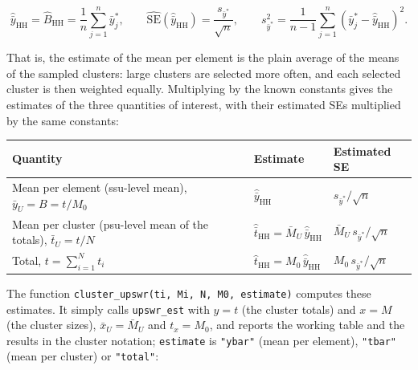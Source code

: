 \documentclass[
  letterpaper,
  DIV=11,
  numbers=noendperiod]{scrreprt}
\newcounter{none} %
\renewcommand{\[}{\begin{equation}}
\renewcommand{\]}{\end{equation}}
\begin{document}
\[
\boxed{\hat{\bar{y}}_{\mathrm{HH}}=\hat{B}_{\mathrm{HH}}=\frac{1}{n}\sum_{j=1}^n \bar{y}_j^*},\qquad
\widehat{\mathrm{SE}}(\hat{\bar{y}}_{\mathrm{HH}})=\frac{s_{\bar{y}^*}}{\sqrt{n}},\qquad
s_{\bar{y}^*}^2=\frac{1}{n-1}\sum_{j=1}^n\left(\bar{y}_j^*-\hat{\bar{y}}_{\mathrm{HH}}\right)^2 .
\]

That is, the estimate of the mean per element is the plain average of
the means of the sampled clusters: large clusters are selected more
often, and each selected cluster is then weighted equally. Multiplying
by the known constants gives the estimates of the three quantities of
interest, with their estimated SEs multiplied by the same constants:

{\def\LTcaptype{none} %
\begin{longtable}[]{@{}
  >{\raggedright\arraybackslash}p{}
  >{\raggedright\arraybackslash}p{}
  >{\raggedright\arraybackslash}p{}@{}}
\toprule\noalign{}
\begin{minipage}[b]{\linewidth}\raggedright
Quantity
\end{minipage} & \begin{minipage}[b]{\linewidth}\raggedright
Estimate
\end{minipage} & \begin{minipage}[b]{\linewidth}\raggedright
Estimated SE
\end{minipage} \\
\midrule\noalign{}
\endhead
\bottomrule\noalign{}
\endlastfoot
Mean per element (ssu-level mean), \(\bar{y}_U=B=t/M_0\) &
\(\hat{\bar{y}}_{\mathrm{HH}}\) & \(s_{\bar{y}^*}/\sqrt{n}\) \\
Mean per cluster (psu-level mean of the totals), \(\bar{t}_U=t/N\) &
\(\hat{\bar{t}}_{\mathrm{HH}}=\bar{M}_U\,\hat{\bar{y}}_{\mathrm{HH}}\) &
\(\bar{M}_U\,s_{\bar{y}^*}/\sqrt{n}\) \\
Total, \(t=\sum_{i=1}^N t_i\) &
\(\hat{t}_{\mathrm{HH}}=M_0\,\hat{\bar{y}}_{\mathrm{HH}}\) &
\(M_0\,s_{\bar{y}^*}/\sqrt{n}\) \\
\end{longtable}
}

The function \texttt{cluster\_upswr(ti,\ Mi,\ N,\ M0,\ estimate)}
computes these estimates. It simply calls \texttt{upswr\_est} with
\(y=t\) (the cluster totals) and \(x=M\) (the cluster sizes),
\(\bar{x}_U=\bar{M}_U\) and \(t_x=M_0\), and reports the working table
and the results in the cluster notation; \texttt{estimate} is
\texttt{"ybar"} (mean per element), \texttt{"tbar"} (mean per cluster)
or \texttt{"total"}:
\end{document}
